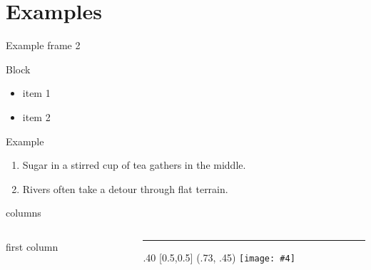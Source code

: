 \documentclass[aspectratio=43]{beamer}
\makeatletter
\renewcommand{\cite}[1]{\footnote<.->[frame]{\fullcite{#1}}}
\newcommand{\absimage}[4][0.5,0.5]{%
	\begin{textblock}{#3}%
		[#1]%
		(#2)%
		\texttt{[image: \#4]}%
\end{textblock}}
\newcommand{\mininomen}[2][1]{{\let\thefootnote\relax%
	\footnotetext{\begin{tabular}{*{#1}{@{\!}>{\centering\arraybackslash}p{1em}@{\;}p{\textwidth/#1-2em}}}%
	#2\end{tabular}}}}
\makeatother
\begin{document}
\section{Examples}
\begin{frame}{Example frame 2}
  \begin{block}{Block}
    \begin{itemize}
      \item item 1
      \item item 2
    \end{itemize}
  \end{block}

  \begin{exampleblock}{Example}
    \begin{enumerate}
      \item Sugar in a stirred cup of tea gathers in the middle.
      \item Rivers often take a detour through flat terrain.
    \end{enumerate}
  \end{exampleblock}

\end{frame}

	
	
	
	

\begin{frame}{columns}
  \begin{columns}[onlytextwidth]
    \begin{column}{.5\textwidth}
      first column
    \end{column}
    \begin{column}{.5\textwidth}
      \textcolor{tudCyan}{\rule{1\columnwidth}{1\columnwidth}}
      \absimage{.73, .45}{.40}{imgs/logo-ugr.pdf}
    \end{column}
  \end{columns}
\end{frame}
\end{document}
